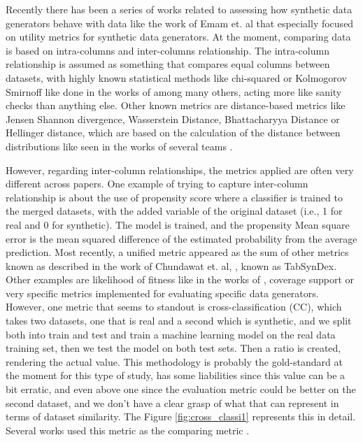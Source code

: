 
Recently there has been a series of works related to assessing how synthetic data generators behave with data like the work of Emam et. al \cite{emamUtilityMetricsEvaluating2022} that especially focused on utility metrics for synthetic data generators. At the moment, comparing data is based on intra-columns and inter-columns relationship. The intra-column relationship is assumed as something that compares equal columns between datasets, with highly known statistical methods like chi-squared or Kolmogorov Smirnoff like done in the works of \cite{combrinkComparingSyntheticTabular2022} among many others, acting more like sanity checks than anything else. Other known metrics are distance-based metrics like Jensen Shannon divergence, Wasserstein Distance, Bhattacharyya Distance or Hellinger distance, which are based on the calculation of the distance between distributions like seen in the works of several teams \cite{ISI:000557358500024,choiGeneratingMultilabelDiscrete2017,Baowaly2019}.

However, regarding inter-column relationships, the metrics applied are often very different across papers. One example of trying to capture inter-column relationship is about the use of propensity score \cite{rosenbaumCentralRolePropensity1983,mullerEvaluationSyntheticElectronic2022} where a classifier is trained to the merged datasets, with the added variable of the original dataset (i.e., 1 for real and 0 for synthetic). The model is trained, and the propensity Mean square error is the  mean squared difference of the estimated probability from the average prediction.
Most recently, a unified metric appeared as the sum of other metrics known as described in the work of Chundawat et. al, \cite{chundawatTabSynDexUniversalMetric2022}, known as TabSynDex. Other examples are likelihood of fitness like in the works of \cite{xuModelingTabularData2019b}, coverage support \cite{goncalvesGenerationEvaluationSynthetic2020a} or very specific metrics implemented for evaluating specific data generators.
However, one metric that seems to standout is cross-classification (CC), which takes two datasets, one that is real and a second which is synthetic, and we split both into train and test and train a machine learning model on the real data training set, then we test the model on both test sets. Then a ratio is created, rendering the actual value. This methodology is probably the gold-standard at the moment for this type of study, has some liabilities since this value can be a bit erratic, and even above one since the evaluation metric could be better on the second dataset, and we don't have a clear grasp of what that can represent in terms of dataset similarity. The Figure \ref{fig:cross_classi1} represents this in detail. Several works used this metric as the comparing metric \cite{mullerEvaluationSyntheticElectronic2022}.

